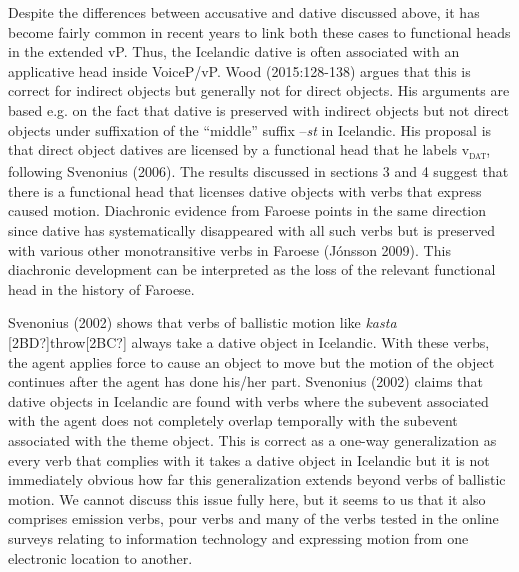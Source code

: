 \begin{styleStandard}
Despite the differences between accusative and dative discussed above, it has become fairly common in recent years to link both these cases to functional heads in the extended vP. Thus, the Icelandic dative is often associated with an applicative head inside VoiceP/vP. Wood (2015:128-138) argues that this is correct for indirect objects but generally not for direct objects. His arguments are based e.g. on the fact that dative is preserved with indirect objects but not direct objects under suffixation of the “middle” suffix –\textit{st} in Icelandic. His proposal is that direct object datives are licensed by a functional head that he labels v\textsc{\textsubscript{dat}}, following Svenonius (2006). The results discussed in sections 3 and 4 suggest that there is a functional head that licenses dative objects with verbs that express caused motion. Diachronic evidence from Faroese points in the same direction since dative has systematically disappeared with all such verbs but is preserved with various other monotransitive verbs in Faroese (Jónsson 2009). This diachronic development can be interpreted as the loss of the relevant functional head in the history of Faroese.
\end{styleStandard}

\begin{styleStandard}
Svenonius (2002) shows that verbs of ballistic motion like \textit{kasta} [2BD?]throw[2BC?] always take a dative object in Icelandic. With these verbs, the agent applies force to cause an object to move but the motion of the object continues after the agent has done his/her part. Svenonius (2002) claims that dative objects in Icelandic are found with verbs where the subevent associated with the agent does not completely overlap temporally with the subevent associated with the theme object. This is correct as a one-way generalization as every verb that complies with it takes a dative object in Icelandic but it is not immediately obvious how far this generalization extends beyond verbs of ballistic motion. We cannot discuss this issue fully here, but it seems to us that it also comprises emission verbs, pour verbs and many of the verbs tested in the online surveys relating to information technology and expressing motion from one electronic location to another. 
\end{styleStandard}

